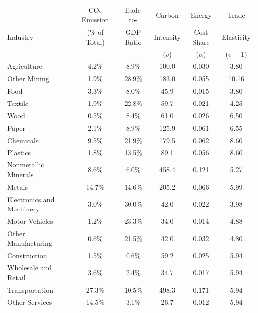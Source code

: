 \begin{tabular}{l ccccc}
\toprule
&
$\text{CO}_2$ Emission & Trade-to- & Carbon & Energy & Trade \\
Industry &
(\% of Total) & GDP Ratio & Intensity & Cost Share & Elasticity \\
&
& & ($v$) & ($\alpha$) & ($\sigma -1$) \\
\midrule
Agriculture & 4.2\% & 8.9\% & 100.0 & 0.030 & 3.80 \\Other Mining & 1.9\% & 28.9\% & 183.0 & 0.055 & 10.16 \\Food & 3.3\% & 8.0\% & 45.9 & 0.015 & 3.80 \\Textile & 1.9\% & 22.8\% & 59.7 & 0.021 & 4.25 \\Wood & 0.5\% & 8.4\% & 61.0 & 0.026 & 6.50 \\Paper & 2.1\% & 8.9\% & 125.9 & 0.061 & 6.55 \\Chemicals & 9.5\% & 21.9\% & 179.5 & 0.062 & 8.60 \\Plastics & 1.8\% & 13.5\% & 89.1 & 0.056 & 8.60 \\Nonmetallic Minerals & 8.6\% & 6.0\% & 458.4 & 0.121 & 5.27 \\Metals & 14.7\% & 14.6\% & 205.2 & 0.066 & 5.99 \\Electronics and Machinery & 3.0\% & 30.0\% & 42.0 & 0.022 & 3.98 \\Motor Vehicles & 1.2\% & 23.3\% & 34.0 & 0.014 & 4.88 \\Other Manufacturing & 0.6\% & 21.5\% & 42.0 & 0.032 & 4.80 \\Construction & 1.5\% & 0.6\% & 59.2 & 0.025 & 5.94 \\Wholesale and Retail & 3.6\% & 2.4\% & 34.7 & 0.017 & 5.94 \\Transportation & 27.3\% & 10.5\% & 498.3 & 0.171 & 5.94 \\Other Services & 14.5\% & 3.1\% & 26.7 & 0.012 & 5.94 \\ \bottomrule
\end{tabular}
